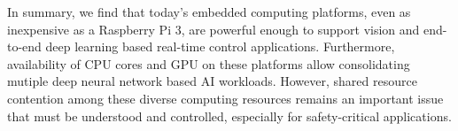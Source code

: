 In summary, we find that today's embedded computing platforms, even as
inexpensive as a Raspberry Pi 3, are powerful enough to support
vision and end-to-end deep learning based real-time control
applications. Furthermore, availability of CPU cores and GPU on these
platforms allow consolidating mutiple deep neural network based AI
workloads. However, shared resource contention among these diverse
computing resources remains an important issue that must be understood
and controlled, especially for safety-critical applications.




